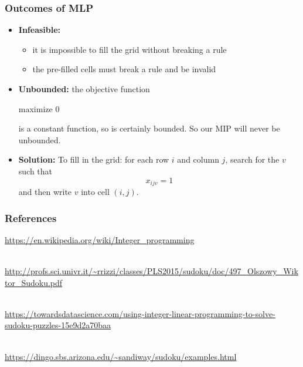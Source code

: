 \documentclass{beamer}
\newcommand{\stanza}{ \\~\ }
\begin{document}
\begin{frame} \frametitle{Outcomes of MLP}
  \begin{itemize}
  \item \textbf{Infeasible:}
    \begin{itemize}
    \item it is impossible to fill the grid without breaking a rule
    \item the pre-filled cells must break a rule and be invalid
    \end{itemize}
  \item \textbf{Unbounded:} the objective function

    maximize 0

    is a constant function, so is certainly bounded. So our MIP will
    never be unbounded.

  \item \textbf{Solution:} To fill in the grid: for each row $i$ and
    column $j$, search for the $v$ such that
    \[ x_{ijv}=1 \]
    and then write $v$ into cell $(i, j).$

  \end{itemize}
\end{frame}

\begin{frame} \frametitle{References}
  \url{https://en.wikipedia.org/wiki/Integer_programming}
  \stanza
  
  \url{http://profs.sci.univr.it/~rrizzi/classes/PLS2015/sudoku/doc/497_Olszowy_Wiktor_Sudoku.pdf}
  \stanza

  \url{https://towardsdatascience.com/using-integer-linear-programming-to-solve-sudoku-puzzles-15e9d2a70baa}
  \stanza

  \url{https://dingo.sbs.arizona.edu/~sandiway/sudoku/examples.html}
\end{frame}
\end{document}
